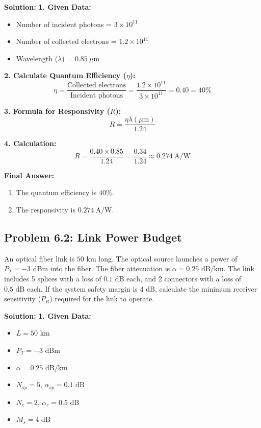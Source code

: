 \textbf{Solution:}
\textbf{1. Given Data:}
\begin{itemize}
  \item   Number of incident photons = $3 \times 10^{11}$
  \item   Number of collected electrons = $1.2 \times 10^{11}$
  \item   Wavelength ($\lambda$) = $0.85\ \mu\text{m}$
\end{itemize}

\textbf{2. Calculate Quantum Efficiency ($\eta$):}
\[ \eta = \frac{\text{Collected electrons}}{\text{Incident photons}} = \frac{1.2 \times 10^{11}}{3 \times 10^{11}} = 0.40 = 40\% \]

\textbf{3. Formula for Responsivity ($R$):}
\[ R = \frac{\eta \lambda(\mu\text{m})}{1.24} \]

\textbf{4. Calculation:}
\[ R = \frac{0.40 \times 0.85}{1.24} = \frac{0.34}{1.24} \approx 0.274\ \text{A/W} \]

\textbf{Final Answer:}
\begin{enumerate}
  \item The quantum efficiency is \textbf{$40\%$}.
  \item The responsivity is \textbf{$0.274\ \text{A/W}$}.
\end{enumerate}


\subsection{Problem 6.2: Link Power Budget}
An optical fiber link is $50\text{ km}$ long. The optical source launches a power of $P_T = -3\text{ dBm}$ into the fiber. The fiber attenuation is $\alpha = 0.25\text{ dB/km}$. The link includes 5 splices with a loss of $0.1\text{ dB}$ each, and 2 connectors with a loss of $0.5\text{ dB}$ each. If the system safety margin is $4\text{ dB}$, calculate the minimum receiver sensitivity ($P_R$) required for the link to operate.

\textbf{Solution:}
\textbf{1. Given Data:}
\begin{itemize}
  \item   $L = 50\text{ km}$
  \item   $P_T = -3\text{ dBm}$
  \item   $\alpha = 0.25\text{ dB/km}$
  \item   $N_{sp} = 5$, $\alpha_{sp} = 0.1\text{ dB}$
  \item   $N_c = 2$, $\alpha_c = 0.5\text{ dB}$
  \item   $M_s = 4\text{ dB}$
\end{itemize}

